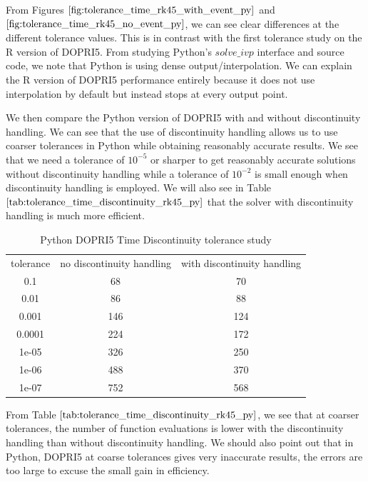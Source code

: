 From Figures $\ref{fig:tolerance_time_rk45_with_event_py}$ and $\ref{fig:tolerance_time_rk45_no_event_py}$, we can see clear differences at the different tolerance values. This is in contrast with the first tolerance study on the R version of DOPRI5. From studying Python's $solve\_ivp$ interface and source code, we note that Python is using dense output/interpolation. We can explain the R version of DOPRI5 performance entirely because it does not use interpolation by default but instead stops at every output point.

We then compare the Python version of DOPRI5 with and without discontinuity handling. We can see that the use of discontinuity handling allows us to use coarser tolerances in Python while obtaining reasonably accurate results. We see that we need a tolerance of $10^{-5}$ or sharper to get reasonably accurate solutions without discontinuity handling while a tolerance of $10^{-2}$ is small enough when discontinuity handling is employed. We will also see in Table $\ref{tab:tolerance_time_discontinuity_rk45_py}$ that the solver with discontinuity handling is much more efficient.


\begin{table}[H]
\caption {Python DOPRI5 Time Discontinuity tolerance study} \label{tab:tolerance_time_discontinuity_rk45_py} 
\begin{center}
\begin{tabular}{ c c c }
tolerance & no discontinuity handling & with discontinuity handling \\ 
0.1 & 68 & 70 \\
0.01 & 86 & 88 \\
0.001 & 146 & 124 \\
0.0001& 224 & 172 \\
1e-05 & 326 & 250 \\
1e-06 & 488 & 370 \\
1e-07 & 752 & 568 \\
\end{tabular}
\end{center}
\end{table}

From Table $\ref{tab:tolerance_time_discontinuity_rk45_py}$, we see that at coarser tolerances, the number of function evaluations is lower with the discontinuity handling than without discontinuity handling. We should also point out that in Python, DOPRI5 at coarse tolerances gives very inaccurate results, the errors are too large to excuse the small gain in efficiency.

